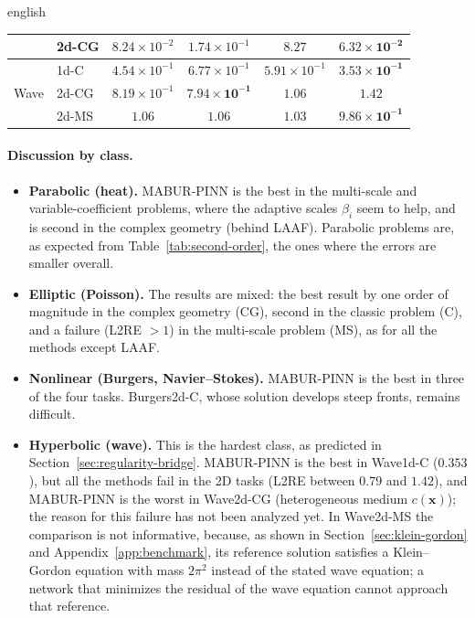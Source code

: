 \documentclass[0000.tex]{subfiles}
\begin{document}
\begin{hyphenrules}{english}
\begin{table}[htbp]
\begin{tabular}{@{}llcccc@{}}
                                    & 2d-CG & $8.24\times10^{-2}$ & $1.74\times10^{-1}$ & $8.27$ & $\mathbf{6.32\times10^{-2}}$ \\
    \midrule
    \multirow{3}{*}{Wave}    & 1d-C  & $4.54\times10^{-1}$ & $6.77\times10^{-1}$ & $5.91\times10^{-1}$ & $\mathbf{3.53\times10^{-1}}$ \\
                             & 2d-CG & $8.19\times10^{-1}$ & $\mathbf{7.94\times10^{-1}}$ & $1.06$ & $1.42$ \\
                             & 2d-MS & $1.06$ & $1.06$ & $1.03$ & $\mathbf{9.86\times10^{-1}}$ \\
    \bottomrule
  \end{tabular}
\end{table}

\paragraph{Discussion by class.}
\begin{itemize}
  \item \textbf{Parabolic (heat).} MABUR-PINN is the best in the multi-scale and variable-coefficient
    problems, where the adaptive scales $\beta_i$ seem to help, and is second in the complex geometry
    (behind LAAF). Parabolic problems are, as expected from Table~\ref{tab:second-order}, the ones where the
    errors are smaller overall.
  \item \textbf{Elliptic (Poisson).} The results are mixed: the best result by one order of magnitude in
    the complex geometry (CG), second in the classic problem (C), and a failure (L2RE $>1$) in the
    multi-scale problem (MS), as for all the methods except LAAF.
  \item \textbf{Nonlinear (Burgers, Navier--Stokes).} MABUR-PINN is the best in three of the four tasks.
    Burgers2d-C, whose solution develops steep fronts, remains difficult.
  \item \textbf{Hyperbolic (wave).} This is the hardest class, as predicted in
    Section~\ref{sec:regularity-bridge}. MABUR-PINN is the best in Wave1d-C ($0.353$), but all the methods fail
    in the 2D tasks (L2RE between $0.79$ and $1.42$), and MABUR-PINN is the worst in Wave2d-CG (heterogeneous medium
    $c(\mathbf{x})$); the reason for this failure has not been analyzed yet. In Wave2d-MS the comparison is not informative, because, as shown
    in Section~\ref{sec:klein-gordon} and Appendix~\ref{app:benchmark}, its reference solution satisfies a Klein--Gordon
    equation with mass $2\pi^2$ instead of the stated wave equation; a network that minimizes the residual
    of the wave equation cannot approach that reference.
\end{itemize}


\end{hyphenrules}
\end{document}
